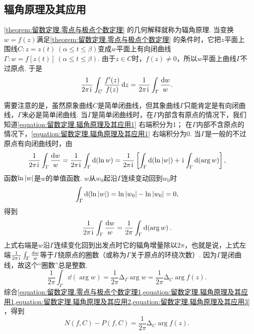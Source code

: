 \subsection{辐角原理及其应用}
\cref{theorem:留数定理.零点与极点个数定理} 的几何解释就称为辐角原理.
当变换\(w = f(z)\)满足\cref{theorem:留数定理.零点与极点个数定理} 的条件时，它把\(z\)平面上围线\(C: z = z(t)\ (\alpha \leqslant t \leqslant \beta)\)变成\(w\)平面上有向闭曲线\(\Gamma: w = f[z(t)]\ (\alpha \leqslant t \leqslant \beta)\).
由于\(z \in C\)时，\(f(z)\neq0\)，所以\(w\)平面上曲线\(\Gamma\)不过原点.
于是\begin{equation}\label{equation:留数定理.辐角原理及其应用1}
\frac{1}{2\pi\kern1pt\mathrm{i}\kern1pt} \int_C \frac{f'(z)}{f(z)} \dd{z}
= \frac{1}{2\pi\kern1pt\mathrm{i}\kern1pt} \int_{\Gamma} \frac{\dd{w}}{w}.
\end{equation}

需要注意的是，虽然原象曲线\(C\)是简单闭曲线，但其象曲线\(\Gamma\)只能肯定是有向闭曲线，\(\Gamma\)未必是简单闭曲线.
当\(\Gamma\)是简单闭曲线时，在\(\Gamma\)内部含有原点的情况下，我们知道\cref{equation:留数定理.辐角原理及其应用1} 右端积分为\(1\)；
在\(\Gamma\)内部不含原点的情况下，\cref{equation:留数定理.辐角原理及其应用1} 右端积分为\(0\).
当\(\Gamma\)是一般的不过原点有向闭曲线时，由\[
\frac{1}{2\pi\kern1pt\mathrm{i}\kern1pt} \int_{\Gamma} \frac{\dd{w}}{w}
= \frac{1}{2\pi\kern1pt\mathrm{i}\kern1pt} \int_{\Gamma} \dd(\ln w)
= \frac{1}{2\pi\kern1pt\mathrm{i}\kern1pt} \left[ \int_{\Gamma} \dd(\ln\abs{w}) + \kern1pt\mathrm{i}\kern1pt \int_{\Gamma} \dd(\arg w) \right],
\]函数\(\ln\abs{w}\)是\(w\)的单值函数.
\(w\)从\(w_0\)起沿\(\Gamma\)连续变动回到\(w_0\)时\[
\int_{\Gamma} \dd(\ln\abs{w})
= \ln\abs{w_0} - \ln\abs{w_0} = 0,
\]得到\begin{equation}\label{equation:留数定理.辐角原理及其应用2}
\frac{1}{2\pi\kern1pt\mathrm{i}\kern1pt} \int_{\Gamma} \frac{\dd{w}}{w}
= \frac{1}{2\pi} \int_{\Gamma} \dd(\arg w).
\end{equation}
上式右端是\(w\)沿\(\Gamma\)连续变化回到出发点时它的辐角增量除以\(2\pi\)，也就是说，上式左端\(\frac{1}{2\pi\kern1pt\mathrm{i}\kern1pt} \int_{\Gamma} \frac{\dd{w}}{w}\)等于\(\Gamma\)绕原点的圈数（或称为\(\Gamma\)关于原点的环绕次数）.
因为\(\Gamma\)是闭曲线，故这个“圈数”总是整数.
\begin{equation}\label{equation:留数定理.辐角原理及其应用3}
\frac{1}{2\pi} \int_{\Gamma} \dd(\arg w)
= \frac{1}{2\pi} \increment_{\Gamma} \arg w
= \frac{1}{2\pi} \increment_C \arg f(z).
\end{equation}
综合\cref{equation:留数定理.零点与极点个数定理1,equation:留数定理.辐角原理及其应用1,equation:留数定理.辐角原理及其应用2,equation:留数定理.辐角原理及其应用3} ，得到\begin{equation}\label{equation:留数定理.辐角原理及其应用4}
N(f,C)-P(f,C) = \frac{1}{2\pi} \increment_C \arg f(z).
\end{equation}

